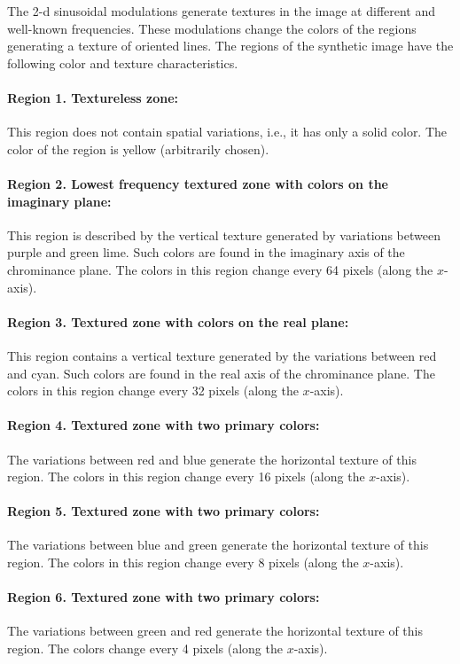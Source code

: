 \documentclass[journal]{IEEEtran}
\begin{document}
The 2-d sinusoidal modulations generate textures in the image at different and well-known frequencies. These modulations change the colors of the regions generating a texture of oriented lines. The regions of the synthetic image have the following color and texture characteristics.

\paragraph{Region 1. Textureless zone:}
This region does not contain spatial variations, i.e., it has only a solid color. The color of the region is yellow (arbitrarily chosen).

\paragraph{Region 2. Lowest frequency textured zone with colors on the imaginary plane:}
This region is described by the vertical texture generated by variations between purple and green lime. Such colors are found in the imaginary axis of the chrominance plane. The colors in this region change every 64 pixels (along the $x$-axis).

\paragraph{Region 3. Textured zone with colors on the real plane:}
This region contains a vertical texture generated by the variations between red and cyan. Such colors are found in the real axis of the chrominance plane. The colors in this region change every 32 pixels (along the $x$-axis).

\paragraph{Region 4. Textured zone with two primary colors:}
The variations between red and blue generate the horizontal texture of this region. The colors in this region change every 16 pixels (along the $x$-axis). 

\paragraph{Region 5. Textured zone with two primary colors:}
The variations between blue and green generate the horizontal texture of this region. The colors in this region change every 8 pixels (along the $x$-axis). 

\paragraph{Region 6. Textured zone with two primary colors:}
The variations between green and red generate the horizontal texture of this region. The colors change every 4 pixels (along the $x$-axis).
\end{document}
